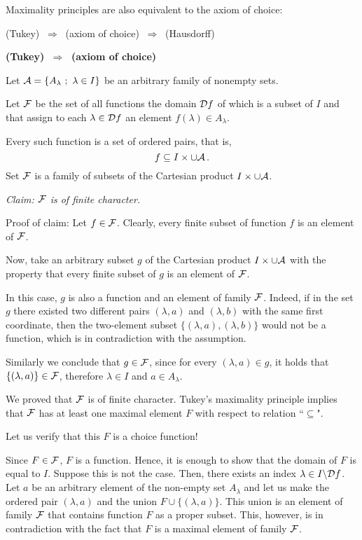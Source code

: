 \documentclass[11pt,paper=b5,footinclude,headinclude]{scrbook} %
\def\sledi {{~\Rightarrow~}}
\theoremstyle{remark}
\theoremstyle{definition} %
\theoremstyle{theorem} %
\begin{document}
Maximality principles are also equivalent to the axiom of choice:

(Tukey) $\sledi$ (axiom of choice) $\sledi$ (Hausdorff)


\bigskip
\textbf{ (Tukey) $\sledi$ (axiom of choice)}

Let ${\cal A} = \{A_\lambda~;~\lambda\in I\}$ be an arbitrary family of nonempty sets.

Let ${\cal F}$ be the set of all functions the domain ${\cal D}f$ of which is a subset of $I$ and
that assign to each $\lambda\in {\cal D}f$ an element $f(\lambda)\in A_\lambda$.

Every such function is a set of ordered pairs, that is,
$$f\subseteq I\times \cup {\cal A}\,.$$
Set ${\cal F}$ is a family of subsets of the Cartesian product $I\times \cup {\cal A}$.

\emph{ Claim: ${\cal F}$ is of finite character.}

Proof of claim: Let $f\in{\cal F}$. Clearly, every finite subset of function $f$ is an element of ${\cal F}$.

Now, take an arbitrary subset $g$ of the Cartesian product $I\times \cup {\cal A}$
with the property that every finite subset of $g$ is an element of  ${\cal F}$.

In this case, $g$ is also a function and an element of family ${\cal F}$. Indeed, if
in the set $g$ there existed two different pairs $(\lambda,a)$ and $(\lambda,b)$ with the same first coordinate,
then the two-element subset $\{(\lambda,a),(\lambda,b)\}$ would not be a function, which is in contradiction with the assumption.

Similarly we conclude that $g\in {\cal F}$, since for every $(\lambda,a)\in g$, it holds that
$\{(\lambda,a)\}\in {\cal F}$, therefore $\lambda\in I$ and $a\in A_\lambda$.

We proved that ${\cal F}$ is of finite character.
Tukey's maximality principle implies that ${\cal F}$ has at least one maximal element $F$ with respect to relation ``$\subseteq$".

Let us verify that this $F$ is a choice function!

Since $F\in{\cal F}$, $F$ is a function.
Hence, it is enough to show that the domain of $F$ is equal to $I$.
Suppose this is not the case. Then, there exists an index $\lambda\in I\backslash {\cal D}f$.
Let $a$ be an arbitrary element of the non-empty set $A_\lambda$ and let us make the ordered pair $(\lambda, a)$ and the union $F\cup\{(\lambda,a)\}$. This union is an element of family ${\cal F}$ that contains function $F$ as a proper subset. This, however, is in contradiction with the fact that $F$ is a maximal element of family ${\cal F}$.
\end{document}
